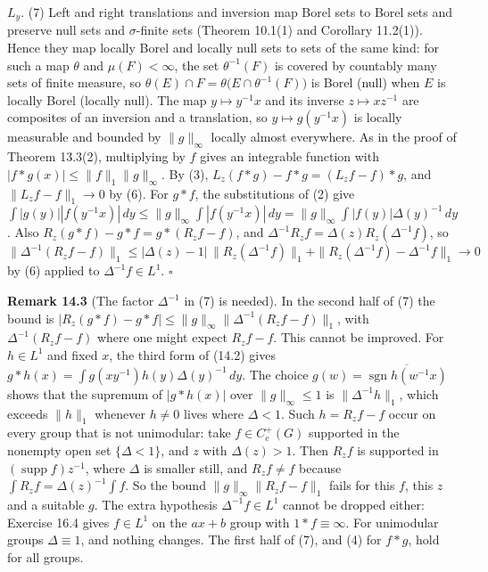 \documentclass[
  english,
  11pt,
  a4paper,
]{article}
\newcounter{none} %
\begin{document}
\(L_y\). (7) Left and right translations and inversion map Borel sets to
Borel sets and preserve null sets and \(\sigma\)-finite sets (Theorem
10.1(1) and Corollary 11.2(1)). Hence they map locally Borel and locally
null sets to sets of the same kind: for such a map \(\theta\) and
\(\mu(F)<\infty\), the set \(\theta^{-1}(F)\) is covered by countably
many sets of finite measure, so
\(\theta(E)\cap F=\theta\big(E\cap\theta^{-1}(F)\big)\) is Borel (null)
when \(E\) is locally Borel (locally null). The map \(y\mapsto y^{-1}x\)
and its inverse \(z\mapsto xz^{-1}\) are composites of an inversion and
a translation, so \(y\mapsto g(y^{-1}x)\) is locally measurable and
bounded by \(\|g\|_\infty\) locally almost everywhere. As in the proof
of Theorem 13.3(2), multiplying by \(f\) gives an integrable function
with \(|f*g(x)|\leq\|f\|_1\|g\|_\infty\). By (3),
\(L_z(f*g)-f*g=(L_zf-f)*g\), and \(\|L_zf-f\|_1\to0\) by (6). For
\(g*f\), the substitutions of (2) give
\(\int|g(y)||f(y^{-1}x)|\,dy\leq\|g\|_\infty\int|f(y^{-1}x)|\,dy=\|g\|_\infty\int|f(y)|\Delta(y)^{-1}\,dy\).
Also \(R_z(g*f)-g*f=g*(R_zf-f)\), and
\(\Delta^{-1}R_zf=\Delta(z)R_z(\Delta^{-1}f)\), so
\[\|\Delta^{-1}(R_zf-f)\|_1\leq|\Delta(z)-1|\,\|R_z(\Delta^{-1}f)\|_1+\|R_z(\Delta^{-1}f)-\Delta^{-1}f\|_1\to0\]
by (6) applied to \(\Delta^{-1}f\in L^1\). \(\square\)

\textbf{Remark 14.3} (The factor \(\Delta^{-1}\) in (7) is needed). In
the second half of (7) the bound is
\(|R_z(g*f)-g*f|\leq\|g\|_\infty\|\Delta^{-1}(R_zf-f)\|_1\), with
\(\Delta^{-1}(R_zf-f)\) where one might expect \(R_zf-f\). This cannot
be improved. For \(h\in L^1\) and fixed \(x\), the third form of (14.2)
gives \(g*h(x)=\int g(xy^{-1})h(y)\Delta(y)^{-1}\,dy\). The choice
\(g(w)=\overline{\operatorname{sgn}h(w^{-1}x)}\) shows that the supremum
of \(|g*h(x)|\) over \(\|g\|_\infty\leq1\) is \(\|\Delta^{-1}h\|_1\),
which exceeds \(\|h\|_1\) whenever \(h\neq0\) lives where \(\Delta<1\).
Such \(h=R_zf-f\) occur on every group that is not unimodular: take
\(f\in C_c^+(G)\) supported in the nonempty open set \(\{\Delta<1\}\),
and \(z\) with \(\Delta(z)>1\). Then \(R_zf\) is supported in
\((\operatorname{supp}f)z^{-1}\), where \(\Delta\) is smaller still, and
\(R_zf\neq f\) because \(\int R_zf=\Delta(z)^{-1}\int f\). So the bound
\(\|g\|_\infty\|R_zf-f\|_1\) fails for this \(f\), this \(z\) and a
suitable \(g\). The extra hypothesis \(\Delta^{-1}f\in L^1\) cannot be
dropped either: Exercise 16.4 gives \(f\in L^1\) on the \(ax+b\) group
with \(1*f\equiv\infty\). For unimodular groups \(\Delta\equiv1\), and
nothing changes. The first half of (7), and (4) for \(f*g\), hold for
all groups.
\end{document}
